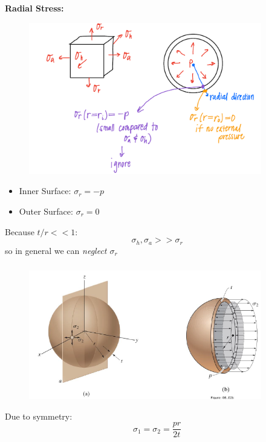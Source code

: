 \vspace{5pt}

\noindent \textbf{Radial Stress:}

\begin{figure}[!h]
\centering
\includegraphics[angle=0, width=4in]{Pressure Vessels-Figures/RadialStress.png}
\vspace{-2mm}
\caption{\small {}}
\vspace{-3mm}
\label{Fig:RadialStress}
\end{figure}

\begin{itemize}
    \item Inner Surface: $\sigma_r = -p$
    \item Outer Surface: $\sigma_r = 0$
\end{itemize}

\noindent Because $t/r << 1$: \[\sigma_h,\sigma_a >> \sigma_r\] so in general we can \textit{neglect $\sigma_r$}

\subsubsection{}

\begin{figure}[!h]
\centering
\includegraphics[angle=0, width=4in]{Pressure Vessels-Figures/SphericalVessel.png}
\vspace{-2mm}
\caption{\small {}}
\vspace{-3mm}
\label{Fig:SphericalVessel}
\end{figure}

\noindent Due to symmetry: \[\sigma_1 = \sigma_2 = \frac{pr}{2t}\]